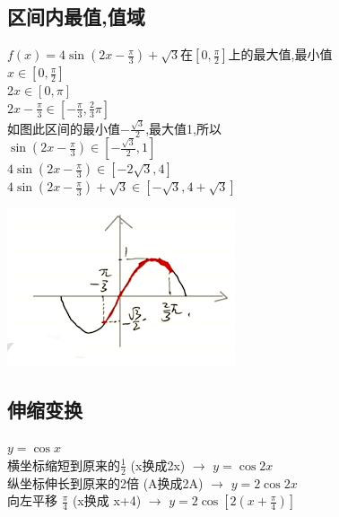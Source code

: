 \documentclass[hyperref, UTF8,11pt,a4paper]{ctexart} %
\begin{document}

\subsection{区间内最值,值域}

\begin{minipage}[h]{0.5\linewidth}
	{\color{red}   $f(x)=4 \sin \left(2 x-\frac{\pi}{3}\right)+\sqrt{3}$在$\left[0, \frac{\pi}{2}\right]$上的最大值,最小值 } \\
	$x \in\left[0, \frac{\pi}{2}\right]$ \\
	2$x \in[0, \pi]$ \\
	$2 x-\frac{\pi}{3} \in\left[-\frac{\pi}{3}, \frac{2}{3} \pi\right]$ \\
	如图此区间的最小值$-\frac{\sqrt{3}}{2}$,最大值1,所以 \\
	$ \sin\left(2 x-\frac{\pi}{3}\right) \in\left[-\frac{\sqrt{3}}{2}, 1\right]$ \\
	$4 \sin \left(2 x-\frac{\pi}{3}\right) \in[-2 \sqrt{3}, 4]$ \\
	$4 \sin \left(2 x-\frac{\pi}{3}\right)+\sqrt{3} \in[-\sqrt{3}, 4+\sqrt{3}]$
\end{minipage}
\hfill
\begin{minipage}[h]{0.5\linewidth}
	\includegraphics[scale=0.8]{pic/sanjiaohanshu/qujianneizuizhi.png}
\end{minipage}


\subsection {伸缩变换}
$y = \cos x$ \\
横坐标缩短到原来的$ \frac{1}{2} $ (x换成2x) $\longrightarrow$ $y= \cos 2x$ \\
纵坐标伸长到原来的2倍 (A换成2A) $\longrightarrow$ $y=  2 \cos 2x$ \\
向左平移 $\frac {\pi}{4} $  (x换成 x+4) $\longrightarrow$ $y=2 \cos \left[2\left(x+\frac{\pi}{4}\right)\right]$
\end{document}
